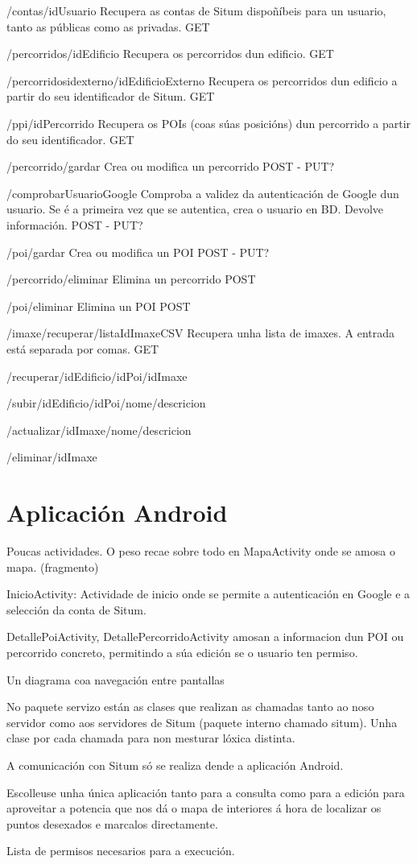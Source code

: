 /contas/{idUsuario}
Recupera as contas de Situm dispoñíbeis para un usuario, tanto as públicas como as privadas.
GET


/percorridos/{idEdificio}
Recupera os percorridos dun edificio.
GET


/percorridosidexterno/{idEdificioExterno}
Recupera os percorridos dun edificio a partir do seu identificador de Situm.
GET


/ppi/{idPercorrido}
Recupera os POIs (coas súas posicións) dun percorrido a partir do seu identificador.
GET


/percorrido/gardar
Crea ou modifica un percorrido
POST - PUT?


/comprobarUsuarioGoogle
Comproba a validez da autenticación de Google dun usuario. Se é a primeira vez que se autentica, crea o usuario en BD. Devolve información.
POST - PUT?


/poi/gardar
Crea ou modifica un POI
POST - PUT?


/percorrido/eliminar
Elimina un percorrido
POST


/poi/eliminar
Elimina un POI
POST


/imaxe/recuperar/{listaIdImaxeCSV}
Recupera unha lista de imaxes. A entrada está separada por comas.
GET


/recuperar/{idEdificio}/{idPoi}/{idImaxe}




/subir/{idEdificio}/{idPoi}/{nome}/{descricion}



/actualizar/{idImaxe}/{nome}/{descricion}



/eliminar/{idImaxe}



\section{Aplicación Android}


Poucas actividades. O peso recae sobre todo en MapaActivity onde se amosa o mapa. (fragmento)


InicioActivity: Actividade de inicio onde se permite a autenticación en Google e a selección da conta de Situm.

DetallePoiActivity, DetallePercorridoActivity amosan a informacion dun POI ou percorrido concreto, permitindo a súa edición se o usuario ten permiso.


Un diagrama coa navegación entre pantallas



No paquete servizo están as clases que realizan as chamadas tanto ao noso servidor como aos servidores de Situm (paquete interno chamado situm). Unha clase por cada chamada para non mesturar lóxica distinta.

A comunicación con Situm só se realiza dende a aplicación Android.

Escolleuse unha única aplicación tanto para a consulta como para a edición para aproveitar a potencia que nos dá o mapa de interiores á hora de localizar os puntos desexados e marcalos directamente.


Lista de permisos necesarios para a execución.

